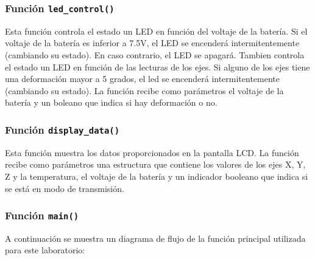 \subsubsection{Función \texttt{led\_control()}}
Esta función controla el estado un LED en función del voltaje de la batería. Si el voltaje de la batería es inferior a 7.5V, el LED se encenderá intermitentemente (cambiando su estado). En caso contrario, el LED se apagará. Tambien controla el estado un LED en función de las lecturas de los ejes. Si alguno de los ejes tiene una deformación mayor a 5 grados, el led se encenderá intermitentemente (cambiando su estado). La función recibe como parámetros el voltaje de la batería y un boleano que indica si hay deformación o no.
\subsubsection{Función \texttt{display\_data()}}
Esta función muestra los datos proporcionados en la pantalla LCD. La función recibe como parámetros una estructura que contiene los valores de los ejes X, Y, Z y la temperatura, el voltaje de la batería y un indicador booleano que indica si se está en modo de transmisión.


\subsubsection{Función \texttt{main()}}
A continuación se muestra un diagrama de flujo de la función principal utilizada para este laboratorio:

